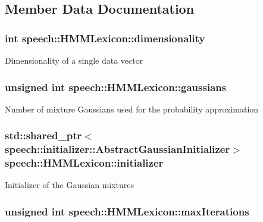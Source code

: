 \subsection{Member Data Documentation}
\hypertarget{classspeech_1_1HMMLexicon_a0e8247e6ee089aced3287ec0488e927b}{
\subsubsection[{dimensionality}]{\setlength{\rightskip}{0pt plus 5cm}int speech\+::\+H\+M\+M\+Lexicon\+::dimensionality\hspace{0.3cm}{\ttfamily [protected]}}}\label{classspeech_1_1HMMLexicon_a0e8247e6ee089aced3287ec0488e927b}
Dimensionality of a single data vector \hypertarget{classspeech_1_1HMMLexicon_a31c5dc5af41ea8a1f7ef825b2581b4d6}{
\subsubsection[{gaussians}]{\setlength{\rightskip}{0pt plus 5cm}unsigned int speech\+::\+H\+M\+M\+Lexicon\+::gaussians\hspace{0.3cm}{\ttfamily [protected]}}}\label{classspeech_1_1HMMLexicon_a31c5dc5af41ea8a1f7ef825b2581b4d6}
Number of mixture Gaussians used for the probability approximation \hypertarget{classspeech_1_1HMMLexicon_a12d561355a3c03df3d6500c422c1b821}{
\subsubsection[{initializer}]{\setlength{\rightskip}{0pt plus 5cm}std\+::shared\+\_\+ptr$<${\bf speech\+::initializer\+::\+Abstract\+Gaussian\+Initializer}$>$ speech\+::\+H\+M\+M\+Lexicon\+::initializer\hspace{0.3cm}{\ttfamily [protected]}}}\label{classspeech_1_1HMMLexicon_a12d561355a3c03df3d6500c422c1b821}
Initializer of the Gaussian mixtures \hypertarget{classspeech_1_1HMMLexicon_a4f7a5e08c169ca9f5a389f25c6fc5972}{
\subsubsection[{max\+Iterations}]{\setlength{\rightskip}{0pt plus 5cm}unsigned int speech\+::\+H\+M\+M\+Lexicon\+::max\+Iterations\hspace{0.3cm}{\ttfamily [protected]}}}\label{classspeech_1_1HMMLexicon_a4f7a5e08c169ca9f5a389f25c6fc5972}
